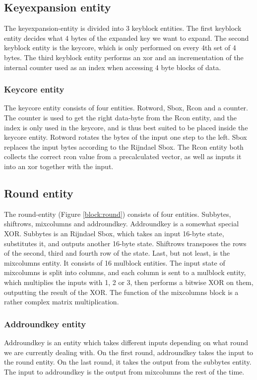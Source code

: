 \subsection{Keyexpansion entity}
The keyexpansion-entity is divided into 3 keyblock entities. The first 
keyblock entity decides what 4 bytes of the expanded key we want to 
expand. The second keyblock entity is the keycore, which is only 
performed on every 4th set of 4 bytes. The third keyblock entity 
performs an xor and an incrementation of the internal counter used as 
an index when accessing 4 byte blocks of data.

\subsubsection{Keycore entity}
The keycore entity consists of four entities. Rotword, Sbox, Rcon and a 
counter. The counter is used to get the right data-byte from the Rcon 
entity, and the index is only used in the keycore, and is thus best 
suited to be placed inside the keycore entity. Rotword rotates the 
bytes of the input one step to the left. Sbox replaces the input bytes 
according to the Rijndael Sbox. The Rcon entity both collects the 
correct rcon value from a precalculated vector, as well as inputs it 
into an xor together with the input.

\subsection{Round entity}
The round-entity (Figure \ref{block:round}) consists of four entities. Subbytes, 
shiftrows, mixcolumns and addroundkey. Addroundkey is a somewhat special XOR. 
Subbytes is an Rijndael Sbox, which takes an input 16-byte state, substitutes 
it, and outputs another 16-byte state. Shiftrows transposes the rows of the 
second, third and fourth row of the state. Last, but not least, is the 
mixcolumns entity. It consists of 16 mulblock entities. The input state of 
mixcolumns is split into columns, and each column is sent to a mulblock entity, 
which multiplies the inputs with 1, 2 or 3, then performs a bitwise XOR on them, 
outputting the result of the XOR. The function of the mixcolumns block is a 
rather complex matrix multiplication.

\subsubsection{Addroundkey entity}
Addroundkey is an entity which takes different inputs depending on 
what round we are currently dealing with. On the first round, addroundkey takes 
the input to the round entity. On the last round, it takes the output from the 
subbytes entity. The input to addroundkey is the output from mixcolumns the rest 
of the time.

